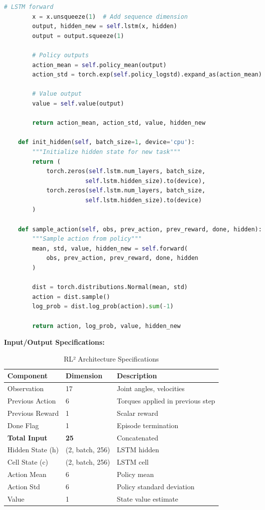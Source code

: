 \documentclass[12pt]{article}
\begin{document}
{{\begin{lstlisting}[language=Python, caption=RL² Architecture for Continuous Control]
        # LSTM forward
        x = x.unsqueeze(1)  # Add sequence dimension
        output, hidden_new = self.lstm(x, hidden)
        output = output.squeeze(1)

        # Policy outputs
        action_mean = self.policy_mean(output)
        action_std = torch.exp(self.policy_logstd).expand_as(action_mean)

        # Value output
        value = self.value(output)

        return action_mean, action_std, value, hidden_new

    def init_hidden(self, batch_size=1, device='cpu'):
        """Initialize hidden state for new task"""
        return (
            torch.zeros(self.lstm.num_layers, batch_size,
                       self.lstm.hidden_size).to(device),
            torch.zeros(self.lstm.num_layers, batch_size,
                       self.lstm.hidden_size).to(device)
        )

    def sample_action(self, obs, prev_action, prev_reward, done, hidden):
        """Sample action from policy"""
        mean, std, value, hidden_new = self.forward(
            obs, prev_action, prev_reward, done, hidden
        )

        dist = torch.distributions.Normal(mean, std)
        action = dist.sample()
        log_prob = dist.log_prob(action).sum(-1)

        return action, log_prob, value, hidden_new
\end{lstlisting}
			
			\textbf{Input/Output Specifications:}
			
			\begin{table}[H]
			\centering
			\caption{RL² Architecture Specifications}
			\begin{tabular}{|l|l|l|}
			\hline
			\textbf{Component} & \textbf{Dimension} & \textbf{Description} \\
			\hline
			Observation & 17 & Joint angles, velocities \\
			\hline
			Previous Action & 6 & Torques applied in previous step \\
			\hline
			Previous Reward & 1 & Scalar reward \\
			\hline
			Done Flag & 1 & Episode termination \\
			\hline
			\textbf{Total Input} & \textbf{25} & Concatenated \\
			\hline
			Hidden State (h) & (2, batch, 256) & LSTM hidden \\
			\hline
			Cell State (c) & (2, batch, 256) & LSTM cell \\
			\hline
			Action Mean & 6 & Policy mean \\
			\hline
			Action Std & 6 & Policy standard deviation \\
			\hline
			Value & 1 & State value estimate \\
			\hline
			\end{tabular}
			\end{table}
			
}}
\end{document}
